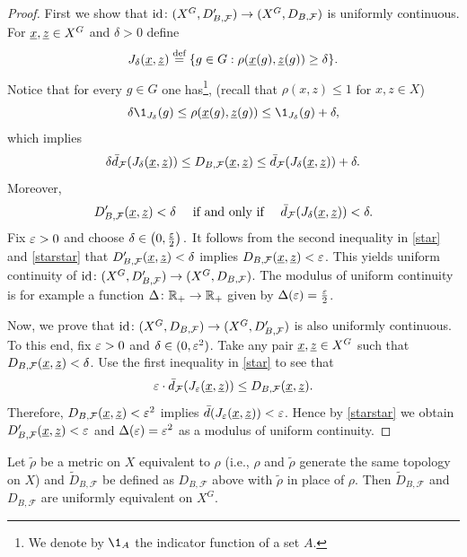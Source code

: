 \begin{proof}
First we show that $\textrm{id}\colon (X^G, D_{B,\operatorname{\mathcal{F}}}')\to (X^G,D_{B,\operatorname{\mathcal{F}}})$ is uniformly continuous.
For $\underline{x},\underline{z}\in X^G$ and $\delta>0$ define
\[
J_\delta(\underline{x},\underline{z})\stackrel{\textup{def}}{=}\{g\in G:\rho(\underline{x}(g),\underline{z}(g))\ge \delta\}.
\]
Notice that for every $g\in G$ one has\footnote{We denote by $\1_A$ the indicator function of a set $A$.},  (recall that $\rho(x,z)\leq 1$ for $x,z\in X$)
\[
\delta\1_{J_\delta}(g)\leq \rho(\und x(g),\und z(g))\leq\1_{J_\delta}(g)+\delta,
\]
which implies
\begin{equation}\label{star}
\delta \bar{d}_{\mathcal F}(J_\delta(\underline{x},\underline{z}))\le D_{B,\operatorname{\mathcal{F}}}(\underline{x},\underline{z})\leq \bar{d}_{\operatorname{\mathcal{F}}}(J_\delta(\underline{x},\underline{z}))+\delta.
\end{equation}
Moreover,
\begin{equation}\label{starstar}
D'_{B,\operatorname{\mathcal{F}}}(\underline{x},\underline{z})<\delta \quad \text{ if and only if }\quad \bar{d}_{\mathcal F}(J_\delta(\underline{x},\underline{z}))<\delta.
\end{equation}
Fix $\varepsilon>0$ and choose $\delta\in\left(0,\frac{\varepsilon}{2}\right).$
It follows from the second inequality in \eqref{star} and \eqref{starstar}  that
$D'_{B,\operatorname{\mathcal{F}}}(\underline{x},\underline{z})<\delta$ implies $D_{B,\operatorname{\mathcal{F}}}(\underline{x},\underline{z})<\varepsilon$.
This yields uniform continuity of $\textrm{id}\colon (X^G, D_{B,\operatorname{\mathcal{F}}}')\to (X^G,D_{B,\operatorname{\mathcal{F}}})$. The modulus of uniform continuity is for example a function $\Delta\colon\mathbb{R}_+\to\mathbb{R}_+$ given by $\Delta(\varepsilon)=\frac{\varepsilon}{2}$.

Now, we prove that $\textrm{id}\colon (X^G, D_{B,\operatorname{\mathcal{F}}})\to (X^G,D_{B,\operatorname{\mathcal{F}}}')$ is also uniformly continuous. 
To this end, fix $\varepsilon>0$ and $\delta\in(0,\varepsilon^2)$.
Take any pair $\underline{x},\underline{z}\in X^G$ such that $D_{B,\operatorname{\mathcal{F}}}(\underline{x},\underline{z})<\delta$. 
Use the first inequality in \eqref{star} to see that
\[
\varepsilon\cdot \bar{d}_{\mathcal F}(J_\varepsilon(\underline{x},\underline{z})) \leq D_{B,\operatorname{\mathcal{F}}}(\underline{x},\underline{z}).
\]
Therefore, $D_{B,\operatorname{\mathcal{F}}}(\underline{x},\underline{z})<\varepsilon^2$ implies $\bar{d}(J_\varepsilon(\underline{x},\underline{z}))<\varepsilon$. 
Hence by \eqref{starstar} we obtain  $D'_{B,\operatorname{\mathcal{F}}}(\underline{x},\underline{z})<\varepsilon$ and $\Delta(\varepsilon)={\varepsilon}^2$ as a modulus of uniform continuity.
\end{proof}

\begin{cor}\label{cor:equiv_m}
Let $\tilde\rho$ be a metric on $X$ equivalent to $\rho$ (i.e., $\rho$ and $\tilde\rho$ generate the same topology on $X$) and $\tilde D_{B,\mathcal F}$ be defined as $D_{B,\mathcal F}$ above with $\tilde\rho$  in place of $\rho$. Then
$\tilde D_{B,\mathcal F}$ and $D_{B,\mathcal F}$ are uniformly equivalent on $X^G$. 
\end{cor}


